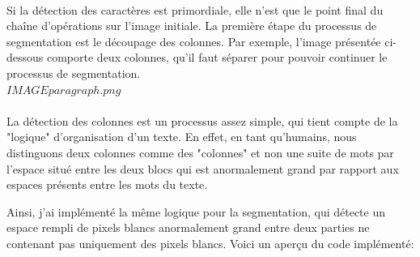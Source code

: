 \documentclass{article}
\begin{document}
    \paragraph{}
    Si la détection des caractères est primordiale, elle n'est que le point final du chaîne d'opérations sur l'image initiale. La première étape du processus de segmentation est le découpage des colonnes. Par exemple, l'image présentée ci-dessous comporte deux colonnes, qu'il faut séparer pour pouvoir continuer le processus de segmentation. \\
    
    $IMAGE paragraph.png$
    
    \paragraph{}
    La détection des colonnes est un processus assez simple, qui tient compte de la "logique" d'organisation d'un texte. En effet, en tant qu'humains, nous distinguons deux colonnes comme des "colonnes" et non une suite de mots par l'espace situé entre les deux blocs qui est anormalement grand par rapport aux espaces présents entre les mots du texte.
    \par
    Ainsi, j'ai implémenté la même logique pour la segmentation, qui détecte un espace rempli de pixels blancs anormalement grand entre deux parties ne contenant pas uniquement des pixels blancs. Voici un aperçu du code implémenté:
    
\end{document}
